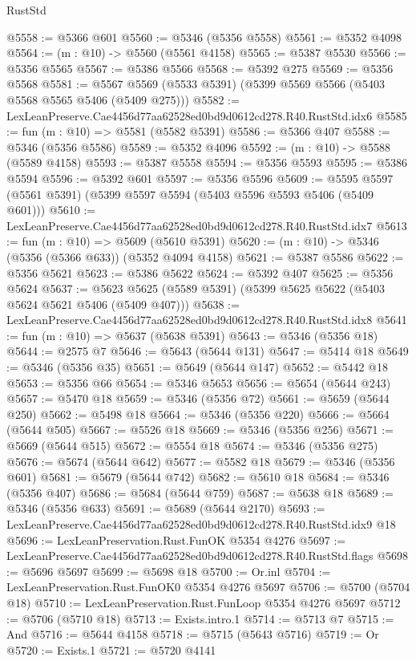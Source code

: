 \begin{lexlean}{RustStd}
\begin{coremodule}
@5558 := @5366 @601
@5560 := @5346 (@5356 @5558)
@5561 := @5352 @4098
@5564 := (m : @10) -> @5560 (@5561 @4158)
@5565 := @5387 @5530
@5566 := @5356 @5565
@5567 := @5386 @5566
@5568 := @5392 @275
@5569 := @5356 @5568
@5581 := @5567 @5569 (@5533 @5391) (@5399 @5569 @5566 (@5403 @5568 @5565 @5406 (@5409 @275)))
@5582 := LexLeanPreserve.Cae4456d77aa62528ed0bd9d0612cd278.R40.RustStd.idx6
@5585 := fun (m : @10) => @5581 (@5582 @5391)
@5586 := @5366 @407
@5588 := @5346 (@5356 @5586)
@5589 := @5352 @4096
@5592 := (m : @10) -> @5588 (@5589 @4158)
@5593 := @5387 @5558
@5594 := @5356 @5593
@5595 := @5386 @5594
@5596 := @5392 @601
@5597 := @5356 @5596
@5609 := @5595 @5597 (@5561 @5391) (@5399 @5597 @5594 (@5403 @5596 @5593 @5406 (@5409 @601)))
@5610 := LexLeanPreserve.Cae4456d77aa62528ed0bd9d0612cd278.R40.RustStd.idx7
@5613 := fun (m : @10) => @5609 (@5610 @5391)
@5620 := (m : @10) -> @5346 (@5356 (@5366 @633)) (@5352 @4094 @4158)
@5621 := @5387 @5586
@5622 := @5356 @5621
@5623 := @5386 @5622
@5624 := @5392 @407
@5625 := @5356 @5624
@5637 := @5623 @5625 (@5589 @5391) (@5399 @5625 @5622 (@5403 @5624 @5621 @5406 (@5409 @407)))
@5638 := LexLeanPreserve.Cae4456d77aa62528ed0bd9d0612cd278.R40.RustStd.idx8
@5641 := fun (m : @10) => @5637 (@5638 @5391)
@5643 := @5346 (@5356 @18)
@5644 := @2575 @7
@5646 := @5643 (@5644 @131)
@5647 := @5414 @18
@5649 := @5346 (@5356 @35)
@5651 := @5649 (@5644 @147)
@5652 := @5442 @18
@5653 := @5356 @66
@5654 := @5346 @5653
@5656 := @5654 (@5644 @243)
@5657 := @5470 @18
@5659 := @5346 (@5356 @72)
@5661 := @5659 (@5644 @250)
@5662 := @5498 @18
@5664 := @5346 (@5356 @220)
@5666 := @5664 (@5644 @505)
@5667 := @5526 @18
@5669 := @5346 (@5356 @256)
@5671 := @5669 (@5644 @515)
@5672 := @5554 @18
@5674 := @5346 (@5356 @275)
@5676 := @5674 (@5644 @642)
@5677 := @5582 @18
@5679 := @5346 (@5356 @601)
@5681 := @5679 (@5644 @742)
@5682 := @5610 @18
@5684 := @5346 (@5356 @407)
@5686 := @5684 (@5644 @759)
@5687 := @5638 @18
@5689 := @5346 (@5356 @633)
@5691 := @5689 (@5644 @2170)
@5693 := LexLeanPreserve.Cae4456d77aa62528ed0bd9d0612cd278.R40.RustStd.idx9 @18
@5696 := LexLeanPreservation.Rust.FunOK @5354 @4276
@5697 := LexLeanPreserve.Cae4456d77aa62528ed0bd9d0612cd278.R40.RustStd.flags
@5698 := @5696 @5697
@5699 := @5698 @18
@5700 := Or.inl
@5704 := LexLeanPreservation.Rust.FunOK0 @5354 @4276 @5697
@5706 := @5700 (@5704 @18)
@5710 := LexLeanPreservation.Rust.FunLoop @5354 @4276 @5697
@5712 := @5706 (@5710 @18)
@5713 := Exists.intro.{1}
@5714 := @5713 @7
@5715 := And
@5716 := @5644 @4158
@5718 := @5715 (@5643 @5716)
@5719 := Or
@5720 := Exists.{1}
@5721 := @5720 @4141

\end{coremodule}
\end{lexlean}
